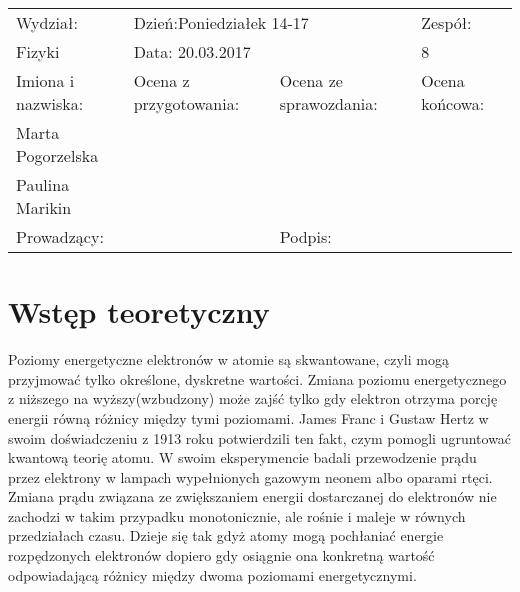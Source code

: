 \documentclass[a4paper,10pt]{article}
\def\arraystretch{1.2}
\begin{document}
\begin{table}
  \centering
  \def\arraystretch{1.5}
    \begin{tabular}{|l|l|l|l|} \hline
    Wydział:           & \multicolumn{2}{l|}{Dzień:Poniedziałek 14-17}    &Zespół:  \\
    Fizyki             &    \multicolumn{2}{l|}{Data: 20.03.2017}         &8             \\\hline
    Imiona i nazwiska: &Ocena z przygotowania:  &Ocena ze sprawozdania:   &Ocena końcowa: \\
    Marta Pogorzelska  &                        &                         &                \\
    Paulina Marikin    &                        &                         &\\\hline
    \multicolumn{2}{|l|}{Prowadzący:                 } &\multicolumn{2}{l|}{Podpis:             }  \\\hline
  \end{tabular}
\end{table}


\section{Wstęp teoretyczny}
Poziomy energetyczne elektronów w atomie są skwantowane, czyli mogą przyjmować tylko określone, dyskretne wartości. Zmiana poziomu energetycznego z niższego na wyższy(wzbudzony)
może zajść tylko gdy elektron otrzyma porcję energii równą różnicy między tymi poziomami. James Franc i Gustaw Hertz w swoim doświadczeniu z 1913 roku potwierdzili ten fakt, czym
pomogli ugruntować kwantową teorię atomu. W swoim eksperymencie badali przewodzenie prądu przez elektrony w lampach wypełnionych gazowym neonem albo oparami rtęci. Zmiana prądu
związana ze zwiększaniem energii dostarczanej do elektronów nie zachodzi w takim przypadku monotonicznie, ale rośnie i maleje w równych przedziałach czasu. Dzieje się tak gdyż atomy
mogą pochłaniać energie rozpędzonych elektronów dopiero gdy osiągnie ona konkretną wartość odpowiadającą różnicy między dwoma poziomami energetycznymi.
\end{document}
